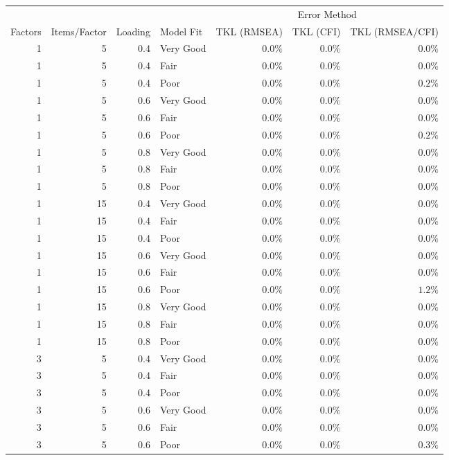 \captionsetup[table]{labelformat=empty,skip=1pt}
\begin{longtable}{rrrlrrr}
\toprule
 &  &  &  & \multicolumn{3}{c}{Error Method} \\ 
 \cmidrule(lr){5-7}
Factors & Items/Factor & Loading & Model Fit & TKL (RMSEA) & TKL (CFI) & TKL (RMSEA/CFI) \\ 
\midrule
1 & 5 & 0.4 & Very Good & $0.0\%$ & $0.0\%$ & $0.0\%$ \\ 
1 & 5 & 0.4 & Fair & $0.0\%$ & $0.0\%$ & $0.0\%$ \\ 
1 & 5 & 0.4 & Poor & $0.0\%$ & $0.0\%$ & $0.2\%$ \\ 
1 & 5 & 0.6 & Very Good & $0.0\%$ & $0.0\%$ & $0.0\%$ \\ 
1 & 5 & 0.6 & Fair & $0.0\%$ & $0.0\%$ & $0.0\%$ \\ 
1 & 5 & 0.6 & Poor & $0.0\%$ & $0.0\%$ & $0.2\%$ \\ 
1 & 5 & 0.8 & Very Good & $0.0\%$ & $0.0\%$ & $0.0\%$ \\ 
1 & 5 & 0.8 & Fair & $0.0\%$ & $0.0\%$ & $0.0\%$ \\ 
1 & 5 & 0.8 & Poor & $0.0\%$ & $0.0\%$ & $0.0\%$ \\ 
1 & 15 & 0.4 & Very Good & $0.0\%$ & $0.0\%$ & $0.0\%$ \\ 
1 & 15 & 0.4 & Fair & $0.0\%$ & $0.0\%$ & $0.0\%$ \\ 
1 & 15 & 0.4 & Poor & $0.0\%$ & $0.0\%$ & $0.0\%$ \\ 
1 & 15 & 0.6 & Very Good & $0.0\%$ & $0.0\%$ & $0.0\%$ \\ 
1 & 15 & 0.6 & Fair & $0.0\%$ & $0.0\%$ & $0.0\%$ \\ 
1 & 15 & 0.6 & Poor & $0.0\%$ & $0.0\%$ & $1.2\%$ \\ 
1 & 15 & 0.8 & Very Good & $0.0\%$ & $0.0\%$ & $0.0\%$ \\ 
1 & 15 & 0.8 & Fair & $0.0\%$ & $0.0\%$ & $0.0\%$ \\ 
1 & 15 & 0.8 & Poor & $0.0\%$ & $0.0\%$ & $0.0\%$ \\ 
3 & 5 & 0.4 & Very Good & $0.0\%$ & $0.0\%$ & $0.0\%$ \\ 
3 & 5 & 0.4 & Fair & $0.0\%$ & $0.0\%$ & $0.0\%$ \\ 
3 & 5 & 0.4 & Poor & $0.0\%$ & $0.0\%$ & $0.0\%$ \\ 
3 & 5 & 0.6 & Very Good & $0.0\%$ & $0.0\%$ & $0.0\%$ \\ 
3 & 5 & 0.6 & Fair & $0.0\%$ & $0.0\%$ & $0.0\%$ \\ 
3 & 5 & 0.6 & Poor & $0.0\%$ & $0.0\%$ & $0.3\%$ \\ 

\end{longtable}

